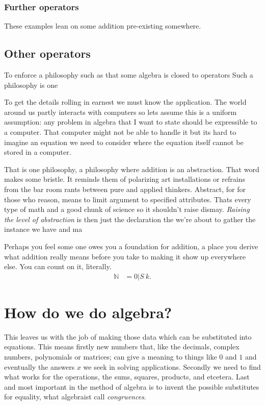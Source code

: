 \subsection{Further operators}




These examples lean on some addition pre-existing somewhere.  





\section*{Other operators}



To enforce a philosophy such as that some algebra is closed to 
operators 
Such a philosophy is one 


To get the details rolling in earnest we must know the application.
The world around us partly interacts with computers so lets assume 
this is a uniform assumption: any problem in algebra that I want to 
state should be expressible to a computer.  That computer might not 
be able to handle it but its hard to imagine an equation we need 
to consider where the equation itself cannot be stored in a computer.




That is one philosophy, a philosophy where addition is an abstraction.
That word makes some bristle.  It reminds them of polarizing art 
installations or refrains from the bar room rants between pure and 
applied thinkers.  Abstract, for for those who reason, means to limit 
argument to specified attributes.  Thats every type of math and a good 
chunk of science so it shouldn't raise dismay.  \emph{Raising the level of 
abstraction} is then just the declaration the we're about to gather the 
instance we have and ma

Perhaps you feel some one owes you a foundation for addition, 
a place you derive what addition really means before you 
take to making it show up everywhere else.
You can count on it, literally.
\begin{align*}
    \mathbb{N} & = 0 | S~k.
\end{align*}


\chapter{How do we do algebra?}

This leaves us with the job of making those data which can be substituted 
into equations.  This means firstly new numbers that, like the decimals, complex 
numbers, polynomials or matrices; can give a meaning to things like $0$ and $1$
and eventually the answers $x$ we seek in solving applications.  Secondly 
we need to find what works for the operations, the sums, squares, products, and 
etcetera.  Last and most important in the method of algebra is to invent the possible 
substitutes for equality, what algebraist call \emph{congruences}.  

